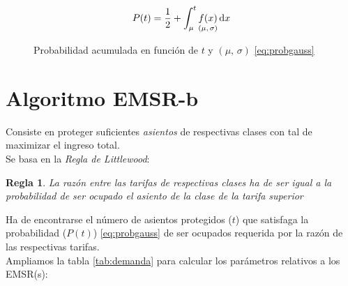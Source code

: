 \documentclass[12pt]{article}
\newtheorem{regla}{Regla}
\begin{document}
\begin{align}
P(t) = \dfrac{1}{2} + \int_\mu^t \underset{(\mu, \, \sigma)}{f(x)}\dif x \label{eq:probgauss}
\end{align}


\begin{figure}
\centering
{}
\caption{Probabilidad acumulada en función de $t$ y $(\mu , \, \sigma)$ \eqref{eq:probgauss}}\label{fig:cdf}
\end{figure}



\section{Algoritmo EMSR-b}

Consiste en proteger suficientes \emph{asientos} de respectivas clases con tal de maximizar el ingreso total.\\

Se basa en la \emph{Regla de Littlewood}:

\begin{regla}
La razón entre las tarifas de respectivas clases ha de ser igual a la probabilidad de ser ocupado el asiento de la clase de la tarifa superior
\end{regla}


Ha de encontrarse el número de asientos protegidos ($t$) que satisfaga la probabilidad ($P(t)$) \eqref{eq:probgauss} de ser ocupados requerida por la razón de las respectivas tarifas.\\

Ampliamos la tabla \ref{tab:demanda} para calcular los parámetros relativos a los EMSR(s):\\
\end{document}

